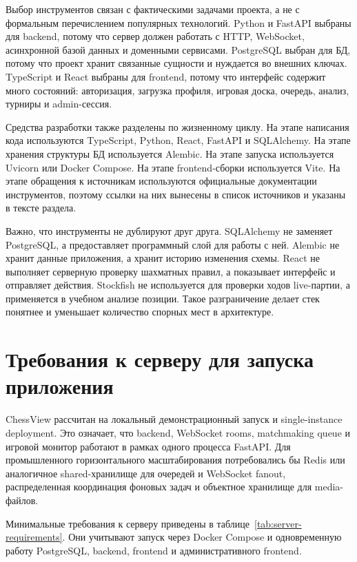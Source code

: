 Выбор инструментов связан с фактическими задачами проекта, а не с формальным перечислением популярных технологий. Python и FastAPI выбраны для backend, потому что сервер должен работать с HTTP, WebSocket, асинхронной базой данных и доменными сервисами. PostgreSQL выбран для БД, потому что проект хранит связанные сущности и нуждается во внешних ключах. TypeScript и React выбраны для frontend, потому что интерфейс содержит много состояний: авторизация, загрузка профиля, игровая доска, очередь, анализ, турниры и admin-сессия.

Средства разработки также разделены по жизненному циклу. На этапе написания кода используются TypeScript, Python, React, FastAPI и SQLAlchemy. На этапе хранения структуры БД используется Alembic. На этапе запуска используется Uvicorn или Docker Compose. На этапе frontend-сборки используется Vite. На этапе обращения к источникам используются официальные документации инструментов, поэтому ссылки на них вынесены в список источников и указаны в тексте раздела.

Важно, что инструменты не дублируют друг друга. SQLAlchemy не заменяет PostgreSQL, а предоставляет программный слой для работы с ней. Alembic не хранит данные приложения, а хранит историю изменения схемы. React не выполняет серверную проверку шахматных правил, а показывает интерфейс и отправляет действия. Stockfish не используется для проверки ходов live-партии, а применяется в учебном анализе позиции. Такое разграничение делает стек понятнее и уменьшает количество спорных мест в архитектуре.

\section{Требования к серверу для запуска приложения}

ChessView рассчитан на локальный демонстрационный запуск и single-instance deployment. Это означает, что backend, WebSocket rooms, matchmaking queue и игровой монитор работают в рамках одного процесса FastAPI. Для промышленного горизонтального масштабирования потребовались бы Redis или аналогичное shared-хранилище для очередей и WebSocket fanout, распределенная координация фоновых задач и объектное хранилище для media-файлов.

Минимальные требования к серверу приведены в таблице~\ref{tab:server-requirements}. Они учитывают запуск через Docker Compose и одновременную работу PostgreSQL, backend, frontend и административного frontend.

